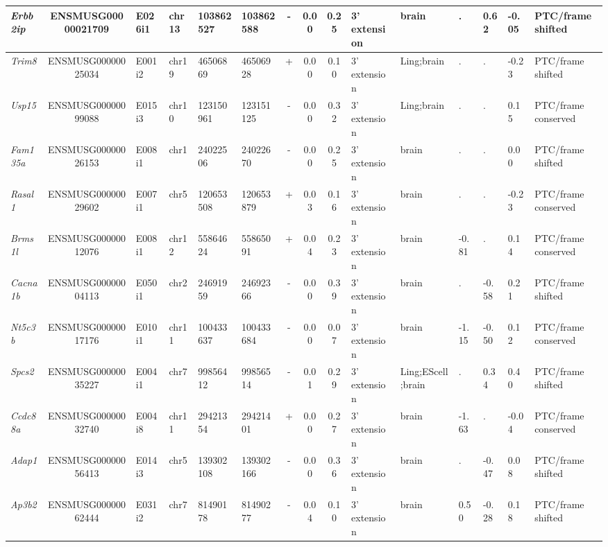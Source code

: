 \begin{appendices}
\begin{landscape}
\begin{table}[htbp]
{\begin{tabular}{|l|c|l|l|l|l|c|c|c|l|l|l|l|l|l|}
		\textit{Erbb2ip} & ENSMUSG00000021709 & E026i1 & chr13 & 103862527 & 103862588 & -     & 0.00  & 0.25  & 3' extension & brain & .     & 0.62  & -0.05 & PTC/frame shifted \\ \hline
		\textit{Trim8} & ENSMUSG00000025034 & E001i2 & chr19 & 46506869 & 46506928 & +     & 0.00  & 0.10  & 3' extension & Ling;brain & .     & .     & -0.23 & PTC/frame shifted \\ \hline
		\textit{Usp15} & ENSMUSG00000099088 & E015i3 & chr10 & 123150961 & 123151125 & -     & 0.00  & 0.32  & 3' extension & Ling;brain & .     & .     & 0.15  & PTC/frame conserved \\ \hline
		\textit{Fam135a} & ENSMUSG00000026153 & E008i1 & chr1  & 24022506 & 24022670 & -     & 0.00  & 0.25  & 3' extension & brain & .     & .     & 0.00  & PTC/frame shifted \\ \hline
		\textit{Rasal1} & ENSMUSG00000029602 & E007i1 & chr5  & 120653508 & 120653879 & +     & 0.03  & 0.16  & 3' extension & brain & .     & .     & -0.23 & PTC/frame conserved \\ \hline
		\textit{Brms1l} & ENSMUSG00000012076 & E008i1 & chr12 & 55864624 & 55865091 & +     & 0.04  & 0.23  & 3' extension & brain & -0.81 & .     & 0.14  & PTC/frame conserved \\ \hline
		\textit{Cacna1b} & ENSMUSG00000004113 & E050i1 & chr2  & 24691959 & 24692366 & -     & 0.00  & 0.39  & 3' extension & brain & .     & -0.58 & 0.21  & PTC/frame shifted \\ \hline
		\textit{Nt5c3b} & ENSMUSG00000017176 & E010i1 & chr11 & 100433637 & 100433684 & -     & 0.00  & 0.07  & 3' extension & brain & -1.15 & -0.50 & 0.12  & PTC/frame conserved \\ \hline
		\textit{Spcs2} & ENSMUSG00000035227 & E004i1 & chr7  & 99856412 & 99856514 & -     & 0.01  & 0.29  & 3' extension & Ling;EScell;brain & .     & 0.34  & 0.40  & PTC/frame shifted \\ \hline
		\textit{Ccdc88a} & ENSMUSG00000032740 & E004i8 & chr11 & 29421354 & 29421401 & +     & 0.00  & 0.27  & 3' extension & brain & -1.63 & .     & -0.04 & PTC/frame conserved \\ \hline
		\textit{Adap1} & ENSMUSG00000056413 & E014i3 & chr5  & 139302108 & 139302166 & -     & 0.00  & 0.36  & 3' extension & brain & .     & -0.47 & 0.08  & PTC/frame shifted \\ \hline
		\textit{Ap3b2} & ENSMUSG00000062444 & E031i2 & chr7  & 81490178 & 81490277 & -     & 0.04  & 0.10  & 3' extension & brain & 0.50  & -0.28 & 0.18  & PTC/frame shifted \\ \hline

\end{tabular}}
\end{table}
\end{landscape}
\end{appendices}
